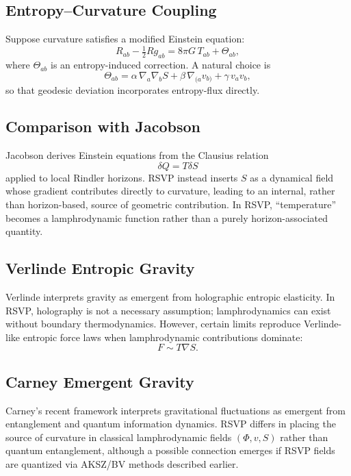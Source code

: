 \documentclass[12pt]{article}
\theoremstyle{plain}
\theoremstyle{definition}
\theoremstyle{remark}
\begin{document}
\subsection{Entropy--Curvature Coupling}

Suppose curvature satisfies a modified Einstein equation:
\[
    R_{ab} - \tfrac12 Rg_{ab} = 8\pi G\, T_{ab} + \Theta_{ab},
\]
where $\Theta_{ab}$ is an entropy-induced correction. A natural choice is
\[
    \Theta_{ab}
    = \alpha\,\nabla_a\nabla_b S
    + \beta\,\nabla_{(a}v_{b)}
    + \gamma\,v_av_b,
\]
so that geodesic deviation incorporates entropy-flux directly.


\subsection{Comparison with Jacobson}

Jacobson derives Einstein equations from the Clausius relation
\[
    \delta Q = T\delta S
\]
applied to local Rindler horizons. RSVP instead inserts $S$ as a dynamical
field whose gradient contributes directly to curvature, leading to an internal,
rather than horizon-based, source of geometric contribution. In RSVP,
``temperature'' becomes a lamphrodynamic function rather than a purely
horizon-associated quantity.


\subsection{Verlinde Entropic Gravity}

Verlinde interprets gravity as emergent from holographic entropic elasticity.
In RSVP, holography is not a necessary assumption; lamphrodynamics can exist
without boundary thermodynamics. However, certain limits reproduce Verlinde-like
entropic force laws when lamphrodynamic contributions dominate:
\[
    F \sim T\nabla S.
\]


\subsection{Carney Emergent Gravity}

Carney's recent framework interprets gravitational fluctuations as emergent
from entanglement and quantum information dynamics. RSVP differs in placing the
source of curvature in classical lamphrodynamic fields $(\Phi,v,S)$ rather than
quantum entanglement, although a possible connection emerges if RSVP fields are
quantized via AKSZ/BV methods described earlier.
\end{document}
